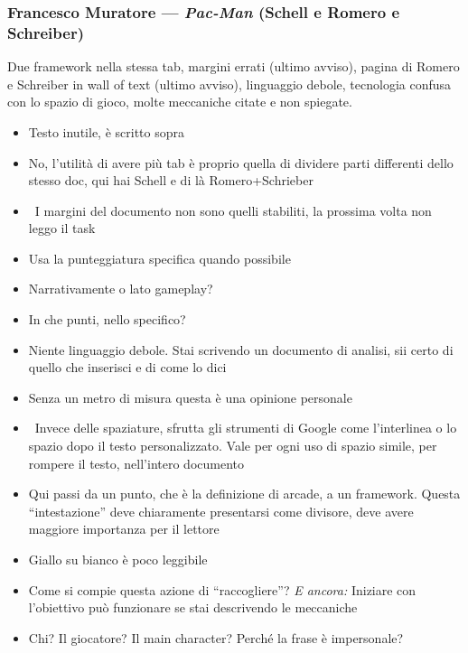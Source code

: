 \subsubsection{Francesco Muratore --- \emph{Pac-Man} (Schell e Romero e
Schreiber)}
Due framework nella stessa tab, margini errati (ultimo avviso), pagina di
Romero e Schreiber in wall of text (ultimo avviso), linguaggio debole,
tecnologia confusa con lo spazio di gioco, molte meccaniche citate e non
spiegate.
{\small
\begin{itemize}
  \item {} Testo inutile, è scritto sopra
  \item {} No, l'utilità di avere più tab è proprio quella di dividere parti differenti dello stesso doc, qui hai Schell e di là Romero+Schrieber
  \item {} \rvAvviso\ I margini del documento non sono quelli stabiliti, la prossima volta non leggo il task
  \item {} Usa la punteggiatura specifica quando possibile
  \item {} Narrativamente o lato gameplay?
  \item {} In che punti, nello specifico?
  \item {} Niente linguaggio debole. Stai scrivendo un documento di analisi, sii certo di quello che inserisci e di come lo dici
  \item {} Senza un metro di misura questa è una opinione personale
  \item \rvVuoto\ Invece delle spaziature, sfrutta gli strumenti di Google come l'interlinea o lo spazio dopo il testo personalizzato. Vale per ogni uso di spazio simile, per rompere il testo, nell'intero documento
  \item {} Qui passi da un punto, che è la definizione di arcade, a un framework. Questa ``intestazione'' deve chiaramente presentarsi come divisore, deve avere maggiore importanza per il lettore
  \item {} Giallo su bianco è poco leggibile
  \item {} Come si compie questa azione di ``raccogliere''? \emph{E ancora:} Iniziare con l'obiettivo può funzionare se stai descrivendo le meccaniche
  \item {} Chi? Il giocatore? Il main character? Perché la frase è impersonale?

\end{itemize}}
